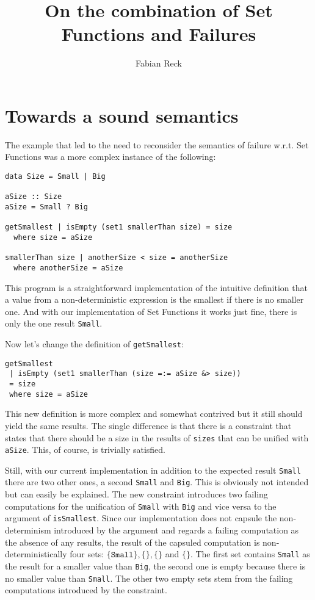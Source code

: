 \documentclass{article}
\title{On the combination of Set Functions and Failures}
\author{Fabian Reck}
\begin{document}
\maketitle

\section{Towards a sound semantics}

The example that led to the need to reconsider the semantics of failure w.r.t.
Set Functions was a more complex instance of the following:

\begin{lstlisting}
data Size = Small | Big

aSize :: Size
aSize = Small ? Big

getSmallest | isEmpty (set1 smallerThan size) = size
  where size = aSize

smallerThan size | anotherSize < size = anotherSize
  where anotherSize = aSize
\end{lstlisting}

This program is a straightforward implementation of the intuitive definition
that a value from a non-deterministic expression is the smallest if there
is no smaller one. And with our implementation of Set Functions it works
just fine, there is only the one result \lstinline{Small}.

Now let's change the definition of \lstinline{getSmallest}:

\begin{lstlisting}
getSmallest 
 | isEmpty (set1 smallerThan (size =:= aSize &> size))
 = size
 where size = aSize
\end{lstlisting}

This new definition is more complex and somewhat contrived but
it still should yield the same results. The single difference is
that there is a constraint that states that there should be a
size in the results of \lstinline{sizes} that can be unified
with \lstinline{aSize}. This, of course, is trivially satisfied.

Still, with our current implementation in addition to the expected
result \lstinline{Small} there are two other ones, a second
\lstinline{Small} and \lstinline{Big}. This is obviously not intended
but can easily be explained. The new constraint introduces two
failing computations for the unification of \lstinline{Small} with
\lstinline{Big} and vice versa to the argument of 
\lstinline{isSmallest}. Since our implementation does not
capsule the non-determinism introduced by the argument and regards
a failing computation as the absence of any results, the result
of the capsuled computation is non-deterministically four sets:
$\{\texttt{Small}\},\{\},\{\}$ and $\{\}$. The first set contains
\lstinline{Small} as the result for a smaller value than \lstinline{Big},
the second one is empty because there is no smaller value than \lstinline{Small}.
The other two empty sets stem from the failing computations introduced by
the constraint.
\end{document}

